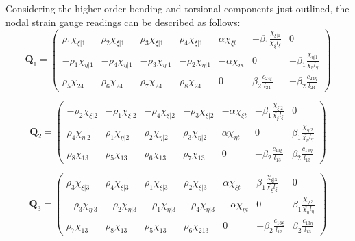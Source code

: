 Considering the higher order bending and torsional components just outlined, the nodal strain gauge readings can be described as follows:
\begin{equation} 
\mathbf{Q}_1 =
\begin{pmatrix}
\rho_1 \chi_{\xi | 1} & \rho_2 \chi_{\xi | 1} & \rho_3 \chi_{\xi | 1} & \rho_4 \chi_{\xi | 1} & \alpha \chi_{\xi t} & -\beta_1 \frac{\chi_{\xi | 1}}{\bar{\chi_\xi} l_\xi} & 0  \\	
-\rho_1 \chi_{\eta | 1} & -\rho_4 \chi_{\eta | 1} & -\rho_3 \chi_{\eta | 1} & -\rho_2 \chi_{\eta | 1} & -\alpha \chi_{\eta t} & 0 & -\beta_1 \frac{\chi_{\eta | 1}}{\bar{\chi_\eta} l_\eta} \\
\rho_5 \chi_{24} & \rho_6 \chi_{24} & \rho_7 \chi_{24} & \rho_8 \chi_{24} & 0 & \beta_2 \frac{c_{24 \xi}}{l_{24}} & -\beta_2 \frac{c_{24 \eta}}{l_{24}}
\end{pmatrix}		
\label{equation14}
\end{equation}

\begin{equation} 
\mathbf{Q}_2 =
\begin{pmatrix}
-\rho_2 \chi_{\xi | 2} & -\rho_1 \chi_{\xi | 2} & -\rho_4 \chi_{\xi | 2} & -\rho_3 \chi_{\xi | 2} & -\alpha \chi_{\xi t} & -\beta_1 \frac{\chi_{\xi | 2}}{\bar{\chi_\xi} l_\xi} & 0  \\	
\rho_4 \chi_{\eta | 2} & \rho_1 \chi_{\eta | 2} & \rho_2 \chi_{\eta | 2} & \rho_3 \chi_{\eta | 2} & \alpha \chi_{\eta t} & 0 & \beta_1 \frac{\chi_{\eta | 2}}{\bar{\chi_\eta} l_\eta} \\
\rho_8 \chi_{13} & \rho_5 \chi_{13} & \rho_6 \chi_{13} & \rho_7 \chi_{13} & 0 & -\beta_2 \frac{c_{13 \xi}}{l_{13}} & \beta_2 \frac{c_{13 \eta}}{l_{13}}
\end{pmatrix}		
\label{equation14_2}
\end{equation}

\begin{equation} 
\mathbf{Q}_3 =
\begin{pmatrix}
\rho_3 \chi_{\xi | 3} & \rho_4 \chi_{\xi | 3} & \rho_1 \chi_{\xi | 3} & \rho_2 \chi_{\xi | 3} & \alpha \chi_{\xi t} & \beta_1 \frac{\chi_{\xi | 3}}{\bar{\chi_\xi} l_\xi} & 0  \\	
-\rho_3 \chi_{\eta | 3} & -\rho_2 \chi_{\eta | 3} & -\rho_1 \chi_{\eta | 3} & -\rho_4 \chi_{\eta | 3} & -\alpha \chi_{\eta t} & 0 & \beta_1 \frac{\chi_{\eta | 3}}{\bar{\chi_\eta} l_\eta} \\
\rho_7 \chi_{13} & \rho_8 \chi_{13} & \rho_5 \chi_{13} & \rho_6 \chi_{213} & 0 & -\beta_2 \frac{c_{13 \xi}}{l_{13}} & \beta_2 \frac{c_{13 \eta}}{l_{13}}
\end{pmatrix}		
\label{equation14_3}
\end{equation}

